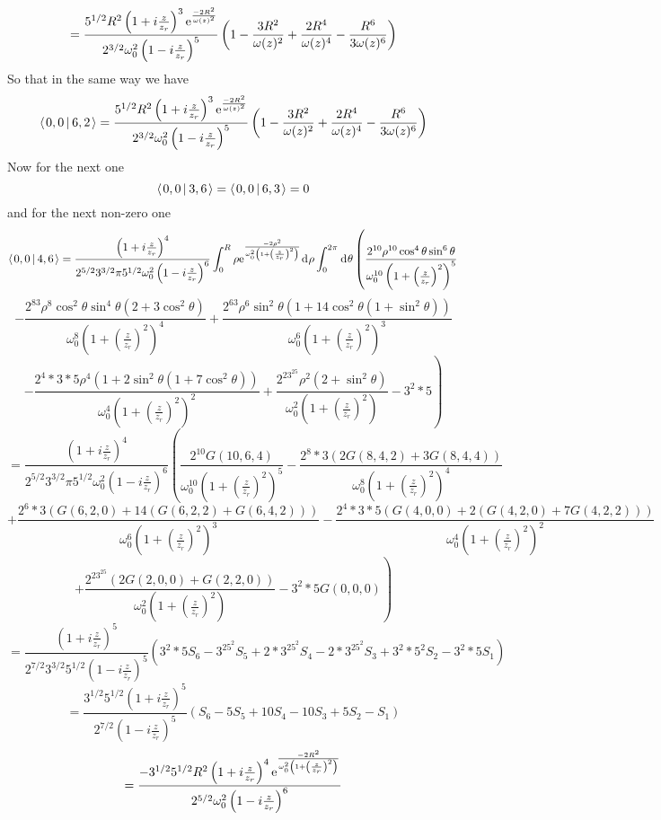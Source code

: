 \documentclass[11pt]{amsart}
\makeatletter
\newcommand{\e}{{\rm e}}				%
\newcommand{\msp}[1]{\mspace{#1mu}}		%
\newcommand{\0}{\varnothing}		%
\newcommand{\dd}{\msp{1} {\rm{d}} \msp{1}}	%
\newcommand{\brac}[2]{\left\langle\msp{2} #1\left\lvert \msp{3.5} #2 \right.\right\rangle}	%
\newcommand{\1}{!}
\newcommand{\2}{@}
\newcommand{\3}{\#}
\newcommand{\4}{\$}
\newcommand{\5}{\%}
\newcommand{\6}{$^\wedge$}
\newcommand{\7}{\&}
\newcommand{\8}{*}
\newcommand{\9}{(}
\makeatother
\begin{document}
\[
=\frac{5^{1/2}R^2\left(1+i\frac{z}{z_r}\right)^3\e^{\frac{-2R^2}{\omega(z)^2}}}{2^{3/2}\omega_0^2\left(1-i\frac{z}{z_r}\right)^5}\left(1-\frac{3R^2}{\omega(z)^2}+\frac{2R^4}{\omega(z)^4}-\frac{R^6}{3\omega(z)^6}\right)
\]
So that in the same way we have
\[
\brac{0,0}{6,2} = \frac{5^{1/2}R^2\left(1+i\frac{z}{z_r}\right)^3\e^{\frac{-2R^2}{\omega(z)^2}}}{2^{3/2}\omega_0^2\left(1-i\frac{z}{z_r}\right)^5}\left(1-\frac{3R^2}{\omega(z)^2}+\frac{2R^4}{\omega(z)^4}-\frac{R^6}{3\omega(z)^6}\right)
\]
Now for the next one
\[
\brac{0,0}{3,6} = \brac{0,0}{6,3} = 0
\]
and for the next non-zero one
\[
\brac{0,0}{4,6} = \frac{\left(1+i\frac{z}{z_r}\right)^4}{2^{5/2}3^{3/2}\pi5^{1/2}\omega_0^2\left(1-i\frac{z}{z_r}\right)^6}\int_0^R\rho\e^{\frac{-2\rho^2}{\omega_0^2\left(1+\left(\frac{z}{z_r}\right)^2\right)}}\dd \rho\int_0^{2\pi} \dd \theta\left(\frac{2^{10}\rho^{10}\cos^4\theta\sin^6\theta}{\omega_0^{10}\left(1+\left(\frac{z}{z_r}\right)^2\right)^5}\right.
\]
\[
\left. -\frac{2^83\rho^8\cos^2\theta\sin^4\theta\left(2+3\cos^2\theta\right)}{\omega_0^8\left(1+\left(\frac{z}{z_r}\right)^2\right)^4}+\frac{2^63\rho^6\sin^2\theta\left(1+14\cos^2\theta\left(1+\sin^2\theta\right)\right)}{\omega_0^6\left(1+\left(\frac{z}{z_r}\right)^2\right)^3}\right.
\]
\[
\left. -\frac{2^4*3*5\rho^4\left(1+2\sin^2\theta\left(1+7\cos^2\theta\right)\right)}{\omega_0^4\left(1+\left(\frac{z}{z_r}\right)^2\right)^2}+\frac{2^23^25\rho^2\left(2+\sin^2\theta\right)}{\omega_0^2\left(1+\left(\frac{z}{z_r}\right)^2\right)}-3^2*5\right)
\]
\[
= \frac{\left(1+i\frac{z}{z_r}\right)^4}{2^{5/2}3^{3/2}\pi5^{1/2}\omega_0^2\left(1-i\frac{z}{z_r}\right)^6}\left(\frac{2^{10}G(10,6,4)}{\omega_0^{10}\left(1+\left(\frac{z}{z_r}\right)^2\right)^5}-\frac{2^8*3\left(2G(8,4,2)+3G(8,4,4)\right)}{\omega_0^8\left(1+\left(\frac{z}{z_r}\right)^2\right)^4}\right.
\]
\[
\left.+\frac{2^6*3\left(G(6,2,0)+14\left(G(6,2,2)+G(6,4,2)\right)\right)}{\omega_0^6\left(1+\left(\frac{z}{z_r}\right)^2\right)^3}-\frac{2^4*3*5\left(G(4,0,0)+2\left(G(4,2,0)+7G(4,2,2)\right)\right)}{\omega_0^4\left(1+\left(\frac{z}{z_r}\right)^2\right)^2}\right.
\]
\[
\left. + \frac{2^23^25\left(2G(2,0,0)+G(2,2,0)\right)}{\omega_0^2\left(1+\left(\frac{z}{z_r}\right)^2\right)}-3^2*5G(0,0,0)\right)
\]
\[
=\frac{\left(1+i\frac{z}{z_r}\right)^5}{2^{7/2}3^{3/2}5^{1/2}\left(1-i\frac{z}{z_r}\right)^5}\left(3^2*5S_6-3^25^2S_5+2*3^25^2S_4-2*3^25^2S_3+3^2*5^2S_2 - 3^2*5S_1\right)
\]
\[
=\frac{3^{1/2}5^{1/2}\left(1+i\frac{z}{z_r}\right)^5}{2^{7/2}\left(1-i\frac{z}{z_r}\right)^5}\left(S_6-5S_5+10S_4-10S_3+5S_2-S_1\right)
\]
\newpage
\[
=\frac{-3^{1/2}5^{1/2}R^2\left(1+i\frac{z}{z_r}\right)^4\e^{\frac{-2R^2}{\omega_0^2\left(1+\left(\frac{z}{z_r}\right)^2\right)}}}{2^{5/2}\omega_0^2\left(1-i\frac{z}{z_r}\right)^6}
\]
\end{document}
